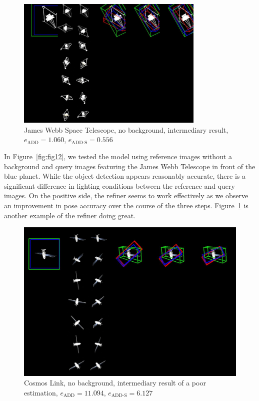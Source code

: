 \begin{figure}[ht]
  \centering
  \includegraphics[width=0.8\textwidth]{data/fig16.jpg}
  \caption{James Webb Space Telescope, no background, intermediary result, $e_\mathrm{ADD}=1.060$, $e_{\mathrm{ADD}\text{-}\mathrm{S}}=0.556$}
  \label{fig:fig16}
\end{figure}


In Figure~\ref{fig:fig12}, we tested the model using reference images without a background and query images featuring the James Webb Telescope in front of the blue planet. While the object detection appears reasonably accurate, there is a significant difference in lighting conditions between the reference and query images. On the positive side, the refiner seems to work effectively as we observe an improvement in pose accuracy over the course of the three steps. Figure~\ref{fig:fig16} is another example of the refiner doing great.

\bigskip
\cleardoublepage{}

\begin{figure}[ht]
  \centering
  \includegraphics[width=\textwidth]{data/fig13.jpg}
  \caption{Cosmos Link, no background, intermediary result of a poor estimation, $e_\mathrm{ADD}=11.094$, $e_{\mathrm{ADD}\text{-}\mathrm{S}}=6.127$}
  \label{fig:fig13}
\end{figure}

